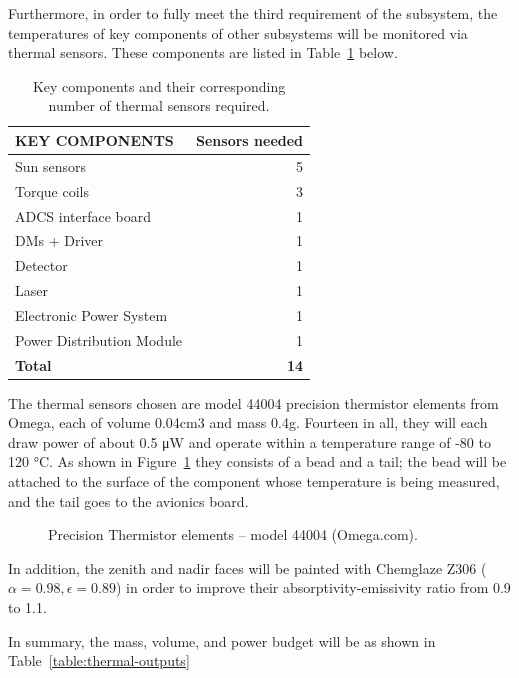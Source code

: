 \documentclass[12pt]{article}
\begin{document}
Furthermore, in order to fully meet the third requirement of the subsystem, the temperatures of key components of other subsystems will be monitored via thermal sensors.  These components are listed in Table~\ref{table:thermal-sensors} below.

\begin{table}[ht]%
\centering
\caption{Key components and their corresponding number of thermal sensors required.}
\label{table:thermal-sensors}
\begin{tabular}{|l|r|}\hline
\textbf{KEY COMPONENTS} & \textbf{Sensors needed} \\\hline
Sun sensors & 5 \\\hline
Torque coils & 3 \\\hline
ADCS interface board & 1 \\\hline
DMs + Driver & 1 \\\hline
Detector & 1 \\\hline
Laser & 1 \\\hline
Electronic Power System & 1 \\\hline
Power Distribution Module & 1 \\\hline
\textbf{Total} & \textbf{14} \\\hline
\end{tabular}
\end{table}

The thermal sensors chosen are model 44004 precision thermistor elements from Omega, each of volume 0.04cm3 and mass 0.4g. Fourteen in all, they will each draw power of about 0.5 μW and operate within a temperature range of -80 to 120 °C. As shown in Figure~\ref{fig:thermal-thermistor} they consists of a bead and a tail; the bead will be attached to the surface of the component whose temperature is being measured, and the tail goes to the avionics board.

\begin{figure}[ht]%
\centering
\caption{Precision Thermistor elements – model 44004 (Omega.com).}%
\label{fig:thermal-thermistor}%
\end{figure}

In addition, the zenith and nadir faces will be painted with Chemglaze Z306 ( $\alpha= 0.98, \epsilon = 0.89$) in order to improve their absorptivity-emissivity ratio from 0.9 to 1.1.

In summary, the mass, volume, and power budget will be as shown in Table~\ref{table:thermal-outputs}
\end{document}
